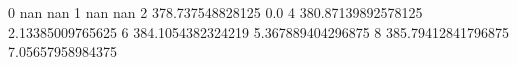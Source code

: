 0 nan nan
1 nan nan
2 378.737548828125 0.0
4 380.87139892578125 2.13385009765625
6 384.1054382324219 5.367889404296875
8 385.79412841796875 7.05657958984375
